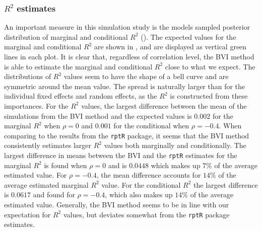 \subsubsection{$R^2$ estimates}
An important measure in this simulation study is the models sampled posterior distribution of marginal and conditional $R^2$ (). The expected values for the marginal and conditional $R^2$ are shown in , and are displayed as vertical green lines in each plot. It is clear that, regardless of correlation level, the BVI method is able to estimate the marginal and conditional $R^2$ close to what we expect. The distributions of $R^2$ values seem to have the shape of a bell curve and are symmetric around the mean value. The spread is naturally larger than for the individual fixed effects and random effects, as the $R^2$ is constructed from these importances. For the $R^2$ values, the largest difference between the mean of the simulations from the BVI method and the expected values is $0.002$ for the marginal $R^2$ when $\rho=0$ and $0.001$ for the conditional when $\rho=-0.4$. When comparing to the results from the \texttt{rptR} package, it seems that the BVI method consistently estimates larger $R^2$ values both marginally and conditionally. The largest difference in means between the BVI and the \texttt{rptR} estimates for the marginal $R^2$ is found when $\rho=0$ and is $0.0448$ which makes up $7\%$ of the average estimated value. For $\rho=-0.4$, the mean difference accounts for $14\%$ of the average estimated marginal $R^2$ value. For the conditional $R^2$ the largest difference is $0.0617$ and found for $\rho=-0.4$, which also makes up $14\%$ of the average estimated value. Generally, the BVI method seems to be in line with our expectation for $R^2$ values, but deviates somewhat from the \texttt{rptR} package estimates.
